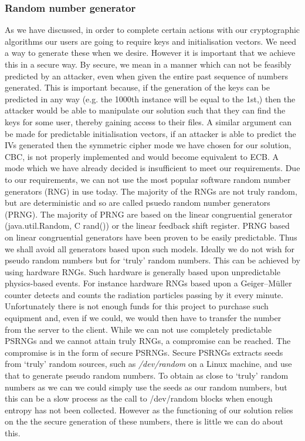 \documentclass[12pt, titlepage]{article}
\begin{document}
\subsubsection{Random number generator}
As we have discussed, in order to complete certain actions with our cryptographic algorithms our users are going to require keys and initialisation vectors. We need a way to generate these when we desire. However it is important that we achieve this in a secure way. By secure, we mean in a manner which can not be feasibly predicted by an attacker, even when given the entire past sequence of numbers generated. This is important because, if the generation of the keys can be predicted in any way (e.g. the 1000th instance will be equal to the 1st,) then the attacker would be able to manipulate our solution such that they can find the keys for some user, thereby gaining access to their files. A similar argument can be made for predictable initialisation vectors, if an attacker is able to predict the IVs generated then the symmetric cipher mode we have chosen for our solution, CBC, is not properly implemented and would become equivalent to ECB. A mode which we have already decided is insufficient to meet our requirements.
\newline \indent Due to our requirements, we can not use the most popular software random number generators (RNG) in use today. The majority of the RNGs are not truly random, but are deterministic and so are called psuedo random number generators (PRNG). The majority of PRNG are based on the linear congruential generator (java.util.Random, C rand()) or the linear feedback shift register. PRNG based on linear congruential generators have been proven to be easily predictable.\cite{lcgPRNGPredictable} Thus we shall avoid all generators based upon such models.
\newline \indent Ideally we do not wish for pseudo random numbers but for `truly' random numbers. This can be achieved by using hardware RNGs. Such hardware is generally based upon unpredictable physics-based events. For instance hardware RNGs based upon a Geiger–Müller counter detects and counts the radiation particles passing by it every minute.\cite{geigerCounter} Unfortunately there is not enough funds for this project to purchase such equipment and, even if we could, we would then have to transfer the number from the server to the client.
\newline \indent While we can not use completely predictable PSRNGs and we cannot attain truly RNGs, a compromise can be reached. The compromise is in the form of secure PSRNGs. Secure PSRNGs extracts seeds from `truly' random sources, such as \textit{/dev/random} on a Linux machine, and use that to generate pseudo random numbers. To obtain as close to `truly' random numbers as we can we could simply use the seeds as our random numbers, but this can be a slow process as the call to /dev/random blocks when enough entropy has not been collected. However as the functioning of our solution relies on the the secure generation of these numbers, there is little we can do about this.
\end{document}
